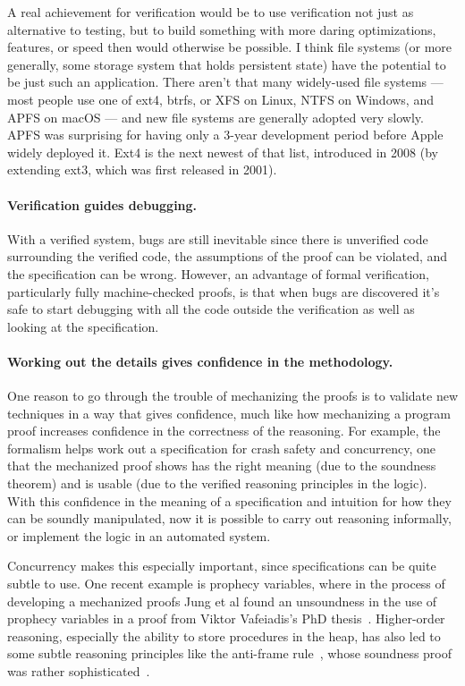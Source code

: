 A real achievement for verification would be to use verification not just as
alternative to testing, but to build something with more daring optimizations,
features, or speed then would otherwise be possible. I think file systems (or
more generally, some storage system that holds persistent state) have the
potential to be just such an application. There aren't that many widely-used
file systems --- most people use one of ext4, btrfs, or XFS on Linux, NTFS on
Windows, and APFS on macOS --- and new file systems are generally adopted very
slowly. APFS was surprising for having only a 3-year development period before
Apple widely deployed it. Ext4 is the next newest of that list, introduced in
2008 (by extending ext3, which was first released in 2001).


\paragraph{Verification guides debugging.} With a verified system, bugs are
still inevitable since there is unverified code surrounding the verified code,
the assumptions of the proof can be violated, and the specification can be
wrong. However, an advantage of formal verification, particularly fully
machine-checked proofs, is that when bugs are discovered it's safe to start
debugging with all the code outside the verification as well as looking at the
specification.

\paragraph{Working out the details gives confidence in the methodology.} One
reason to go through the trouble of mechanizing the proofs is to validate new
techniques in a way that gives confidence, much like how mechanizing a program proof increases
confidence in the correctness of the reasoning. For example, the formalism helps
work out a specification for crash safety and concurrency, one that the
mechanized proof shows has the right meaning (due to the soundness theorem) and
is usable (due to the verified reasoning principles in the logic). With this
confidence in the meaning of a specification and intuition for how they can be
soundly manipulated, now it is possible to carry out reasoning informally, or
implement the logic in an automated system.

Concurrency makes this especially important, since specifications can be quite
subtle to use. One recent example is prophecy variables, where in the process of
developing a mechanized proofs Jung et al found an unsoundness in the use of
prophecy variables in a proof from Viktor Vafeiadis's PhD
thesis~\cite{jung:prophecy,vafeiadis-phd}. Higher-order reasoning, especially
the ability to store procedures in the heap, has also led to some subtle
reasoning principles like the anti-frame rule~\cite{pottier:anti-frame}, whose
soundness proof was rather
sophisticated~\cite{schwinghammer:semantic-anti-frame}.

